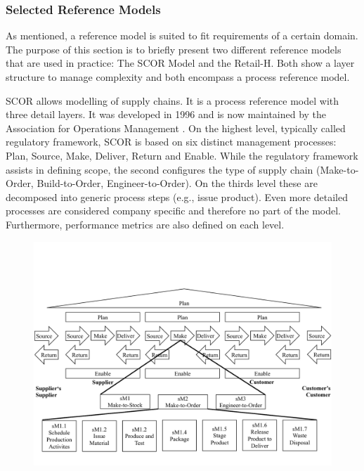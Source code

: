 		
		\subsubsection{Selected Reference Models}
		
		As mentioned, a reference model is suited to fit requirements of a certain domain. The purpose of this section is to briefly present two different reference models that are used in practice: The \acrfull{SCOR} Model and the Retail-H. Both show a layer structure to manage complexity and both encompass a process reference model. 
		
		\acrshort{SCOR} allows modelling of supply chains. It is a process reference model with three detail layers. It was developed in 1996 and is now maintained by the Association for Operations Management \cite{APICS2015}. On the highest level, typically called regulatory framework, \acrshort{SCOR}  is based on six distinct management processes: Plan, Source, Make, Deliver, Return and Enable. While the regulatory framework assists in defining scope, the second configures the type of supply chain (Make-to-Order, Build-to-Order, Engineer-to-Order). On the thirds level these are decomposed into generic process steps (e.g., issue product). Even more detailed processes are considered company specific and therefore no part of the model. Furthermore, performance metrics are also defined on each level. 

		\begin{figure}[caption={SCOR Model}, label={fig:scor}]
		{	\includegraphics[width=.8\textwidth]{figures/scor.pdf}}
		\end{figure}
	

